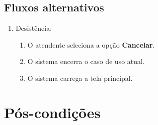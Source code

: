 \subsection{Fluxos alternativos}

\begin{enumerate}
	\item Desistência:
	\begin{enumerate}
		\item O atendente seleciona a opção \textbf{Cancelar}.
		\item O sistema encerra o caso de uso atual.
		\item O sistema carrega a tela principal.
	\end{enumerate}
\end{enumerate}



\section{Pós-condições}


